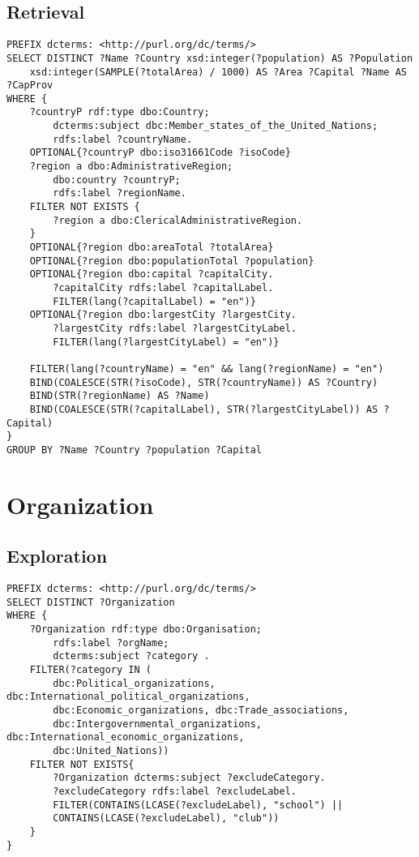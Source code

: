\documentclass[11pt]{article}
\begin{document}
\subsection{Retrieval}
{\footnotesize\begin{verbatim}
PREFIX dcterms: <http://purl.org/dc/terms/>
SELECT DISTINCT ?Name ?Country xsd:integer(?population) AS ?Population 
    xsd:integer(SAMPLE(?totalArea) / 1000) AS ?Area ?Capital ?Name AS ?CapProv
WHERE {
    ?countryP rdf:type dbo:Country;
        dcterms:subject dbc:Member_states_of_the_United_Nations;
        rdfs:label ?countryName.
    OPTIONAL{?countryP dbo:iso31661Code ?isoCode}
    ?region a dbo:AdministrativeRegion;
        dbo:country ?countryP;
        rdfs:label ?regionName.
    FILTER NOT EXISTS {
        ?region a dbo:ClericalAdministrativeRegion.
    }
    OPTIONAL{?region dbo:areaTotal ?totalArea}
    OPTIONAL{?region dbo:populationTotal ?population}
    OPTIONAL{?region dbo:capital ?capitalCity.
        ?capitalCity rdfs:label ?capitalLabel.
        FILTER(lang(?capitalLabel) = "en")}
    OPTIONAL{?region dbo:largestCity ?largestCity.
        ?largestCity rdfs:label ?largestCityLabel.
        FILTER(lang(?largestCityLabel) = "en")}

    FILTER(lang(?countryName) = "en" && lang(?regionName) = "en")
    BIND(COALESCE(STR(?isoCode), STR(?countryName)) AS ?Country)
    BIND(STR(?regionName) AS ?Name)
    BIND(COALESCE(STR(?capitalLabel), STR(?largestCityLabel)) AS ?Capital)
}
GROUP BY ?Name ?Country ?population ?Capital
\end{verbatim}}

\section{Organization}

\subsection{Exploration}
{\footnotesize\begin{verbatim}
PREFIX dcterms: <http://purl.org/dc/terms/>
SELECT DISTINCT ?Organization 
WHERE {
    ?Organization rdf:type dbo:Organisation;
        rdfs:label ?orgName;
        dcterms:subject ?category .
    FILTER(?category IN (
        dbc:Political_organizations, dbc:International_political_organizations,
        dbc:Economic_organizations, dbc:Trade_associations,
        dbc:Intergovernmental_organizations, dbc:International_economic_organizations,
        dbc:United_Nations))
    FILTER NOT EXISTS{
        ?Organization dcterms:subject ?excludeCategory.
        ?excludeCategory rdfs:label ?excludeLabel.
        FILTER(CONTAINS(LCASE(?excludeLabel), "school") ||
        CONTAINS(LCASE(?excludeLabel), "club"))
    }
}
\end{verbatim}}
\end{document}
